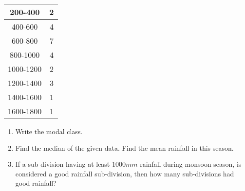 \documentclass{article}
\begin{document}
\begin{enumerate}
\begin{center}
\begin{tabular}{|c|c|}
 200-400 & 2 \\ \hline
 400-600 & 4 \\ \hline
 600-800 & 7 \\ \hline
 800-1000 & 4 \\ \hline
 1000-1200 & 2 \\ \hline
 1200-1400 & 3 \\ \hline
 1400-1600 & 1 \\ \hline
 1600-1800 & 1 \\ \hline
 \end{tabular}
 \end{center}
\begin{enumerate}
\item Write the modal class.
\item Find the median of the given data.
Find the mean rainfall in this season.
\item If a sub-division having at least $1000mm$ rainfall during monsoon season, is considered a good rainfall sub-division, then how many sub-divisions had good rainfall?
\end{enumerate}

\end{enumerate}
\end{document}
